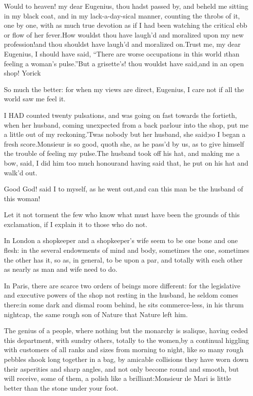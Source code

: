 \documentclass[twoside]{article}
\begin{document}
\tsk Would to heaven! my dear Eugenius, thou hadst passed by, and beheld me
sitting in my black coat, and in my lack-a-day-sical manner, counting the
throbs of it, one by one, with as much true devotion as if I had been
watching the critical ebb or flow of her fever.\tsk How wouldst thou have
laugh’d and moralized upon my new profession!\tsk and thou shouldst have
laugh’d and moralized on.\tsk Trust me, my dear Eugenius, I should have said,
“There are worse occupations in this world \i{than feeling a woman’s
pulse}.”\tsk But a grisette’s! thou wouldst have said,\tsk and in an open shop!
Yorick\tsk 

\tsk So much the better: for when my views are direct, Eugenius, I care not
if all the world saw me feel it.






I HAD counted twenty pulsations, and was going on fast towards the
fortieth, when her husband, coming unexpected from a back parlour into
the shop, put me a little out of my reckoning.\tsk ’Twas nobody but her
husband, she said;\tsk so I began a fresh score.\tsk Monsieur is so good, quoth
she, as he pass’d by us, as to give himself the trouble of feeling my
pulse.\tsk The husband took off his hat, and making me a bow, said, I did him
too much honour\tsk and having said that, he put on his hat and walk’d out.

Good God! said I to myself, as he went out,\tsk and can this man be the
husband of this woman!

Let it not torment the few who know what must have been the grounds of
this exclamation, if I explain it to those who do not.

In London a shopkeeper and a shopkeeper’s wife seem to be one bone and
one flesh: in the several endowments of mind and body, sometimes the one,
sometimes the other has it, so as, in general, to be upon a par, and
totally with each other as nearly as man and wife need to do.

In Paris, there are scarce two orders of beings more different: for the
legislative and executive powers of the shop not resting in the husband,
he seldom comes there:\tsk in some dark and dismal room behind, he sits
commerce-less, in his thrum nightcap, the same rough son of Nature that
Nature left him.

The genius of a people, where nothing but the monarchy is \i{salique},
having ceded this department, with sundry others, totally to the
women,\tsk by a continual higgling with customers of all ranks and sizes from
morning to night, like so many rough pebbles shook long together in a
bag, by amicable collisions they have worn down their asperities and
sharp angles, and not only become round and smooth, but will receive,
some of them, a polish like a brilliant:\tsk Monsieur \i{le Mari} is little
better than the stone under your foot.
\end{document}
